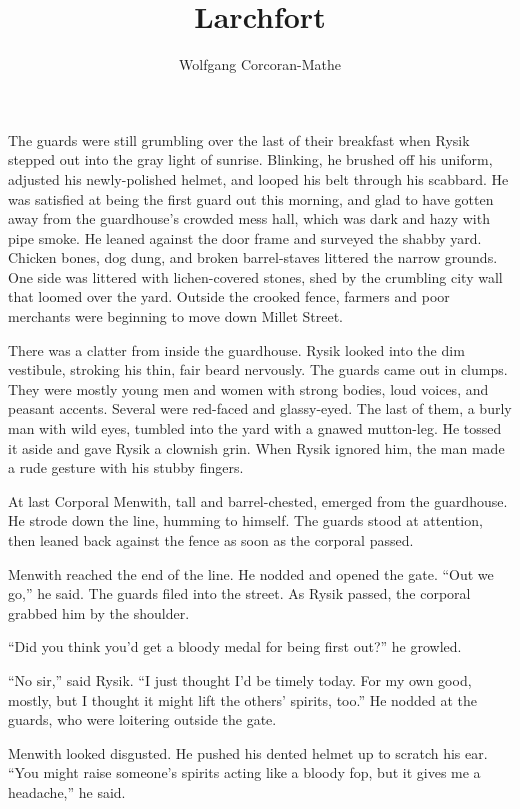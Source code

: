 \documentclass[10pt,a4paper]{article}
\begin{document}
\title{Larchfort}
\author{Wolfgang Corcoran-Mathe}
\date{}
\maketitle

The guards were still grumbling over the last of their breakfast
when Rysik stepped out into the gray light of sunrise. Blinking,
he brushed off his uniform, adjusted his newly-polished helmet,
and looped his belt through his scabbard. He was satisfied at being
the first guard out this morning, and glad to have gotten away from
the guardhouse's crowded mess hall, which was dark and hazy with
pipe smoke. He leaned against the door frame and surveyed the shabby
yard. Chicken bones, dog dung, and broken barrel-staves littered the
narrow grounds. One side was littered with lichen-covered stones,
shed by the crumbling city wall that loomed over the yard. Outside
the crooked fence, farmers and poor merchants were beginning to
move down Millet Street.

There was a clatter from inside the guardhouse. Rysik looked into
the dim vestibule, stroking his thin, fair beard nervously. The
guards came out in clumps. They were mostly young men and women
with strong bodies, loud voices, and peasant accents. Several were
red-faced and glassy-eyed. The last of them, a burly man with wild
eyes, tumbled into the yard with a gnawed mutton-leg. He tossed
it aside and gave Rysik a clownish grin. When Rysik ignored him,
the man made a rude gesture with his stubby fingers.

At last Corporal Menwith, tall and barrel-chested, emerged from the
guardhouse. He strode down the line, humming to himself. The guards
stood at attention, then leaned back against the fence as soon as
the corporal passed.

Menwith reached the end of the line. He nodded and opened the
gate. ``Out we go,'' he said. The guards filed into the street. As
Rysik passed, the corporal grabbed him by the shoulder.

``Did you think you'd get a bloody medal for being first out?''
he growled.

``No sir,'' said Rysik. ``I just thought I'd be timely today. For my
own good, mostly, but I thought it might lift the others' spirits,
too.'' He nodded at the guards, who were loitering outside the gate.

Menwith looked disgusted. He pushed his dented helmet up to scratch
his ear. ``You might raise someone's spirits acting like a bloody fop,
but it gives me a headache,'' he said.
\end{document}

